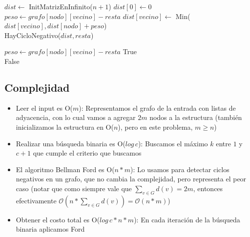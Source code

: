 \begin{algorithm}[H]
\begin{algorithmic}
    
	\State $dist \gets$ InitMatrizEnInfinito($n + 1$)    
	\State $dist[0] \gets 0$    
	\For{$i \in [1..n)$}    
		    
			    
				\State $peso \gets grafo[nodo][vecino] - resta$    
				\State $dist[vecino] \gets$ Min($dist[vecino], dist[nodo] + peso$)      \\
			\EndFor
		\EndFor
	\EndFor
	\Return HayCicloNegativo($dist, resta$)    
\EndFunction
\end{algorithmic}
\end{algorithm}

\begin{algorithm}[H]
\begin{algorithmic}
    
	    
		    
			\State $peso \gets grafo[nodo][vecino] - resta$    
			    
				\State \Return True      \\
			\EndIf
		\EndFor
	\EndFor
	\Return False    
\EndFunction
\end{algorithmic}
\end{algorithm}

\newpage

\subsection{Complejidad}

\begin{itemize}
	\item Leer el input es O($m$): Representamos el grafo de la entrada con listas de adyacencia, con lo cual vamos a agregar $2m$ nodos a la estructura (también inicializamos la estructura en O($n$), pero en este problema, $m \geq n$)
	\item Realizar una búsqueda binaria es O($log \, c$): Buscamos el máximo $k$ entre $1$ y $c+1$ que cumple el criterio que buscamos
	\item El algoritmo Bellman Ford es O($n*m$): Lo usamos para detectar ciclos negativos en un grafo, que no cambia la complejidad, pero representa el peor caso (notar que como siempre vale que $\sum_{v \in G} d(v) = 2m$, entonces efectivamente $\mathcal{O}(n*\sum_{v \in G} d(v)) = \mathcal{O}(n*m)$)
	\item Obtener el costo total es O($log \, c *n*m$): En cada iteración de la búsqueda binaria aplicamos Ford
\end{itemize}

